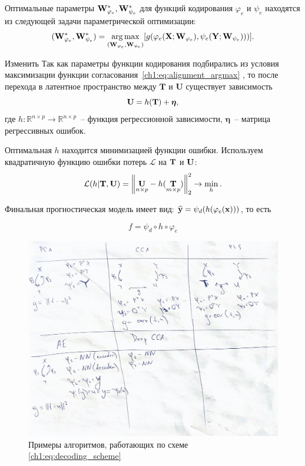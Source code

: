 Оптимальные параметры $\mathbf{W}_{\varphi_e}^{*}, \mathbf{W}_{\psi_e}^{*}$ для функций кодирования $\varphi_e$  и $\psi_e$ находятся из следующей задачи параметрической оптимизации:
\begin{equation}
(\mathbf{W}_{\varphi_e}^{*}, \mathbf{W}_{\psi_e}^{*}) = \mathop{\arg \max}\limits_{(\mathbf{W}_{\varphi_e}, \mathbf{W}_{\psi_e})} [g(\varphi_e(\mathbf{X}; \mathbf{W}_{\varphi_e}), \psi_e(\mathbf{Y}; \mathbf{W}_{\psi_e})))].
\label{ch1:eq:alignment_argmax}
\end{equation}

{\color{red} Изменить} Так как параметры функции кодирования подбирались из условия максимизации функции согласования~\eqref{ch1:eq:alignment_argmax} , то после перехода в латентное пространство между $\mathbf{T}$ и $\mathbf{U}$ существует зависимость
\begin{equation}
\mathbf{U} = h(\mathbf{T}) +  \boldsymbol{\eta},
\label{ch1:eq:alignment_regression}
\end{equation}
где $h: \mathbb{R}^{n \times p} \to \mathbb{R}^{n \times p}$~-- функция регрессионной зависимости,  $\boldsymbol{\eta}$~-- матрица регрессивных ошибок.

Оптимальная $h$ находится минимизацией функции ошибки. Используем квадратичную функцию ошибки потерь $\mathcal{L}$ на $\mathbf{T}$ и $\mathbf{U}$:
\begin{equation}
\mathcal{L}(h | {\mathbf{T}}, {\mathbf{U}}) = {\left\| \underset{n \times p}{\mathbf{U}}  - h(\underset{m \times p}{\mathbf{T}}) \right\| }_2^2 \rightarrow\min_{h}.
\label{ch1:eq:alignment_regression_loss}
\end{equation}

Финальная прогностическая модель имеет вид:
$\widehat{\mathbf{y}} = \psi_d(h(\varphi_e(\mathbf{x})))$, то есть

\begin{equation}
f = \psi_d \circ h \circ \varphi_e
\label{eq:f}
\end{equation}

\begin{figure}[!ht]
	\centering
	\includegraphics[width=\linewidth]{figs/ch1/Examples}
	\caption{Примеры алгоритмов, работающих по схеме \ref{ch1:eq:decoding_scheme}}
	\label{ch1:fig:PLSFigure}
\end{figure}

